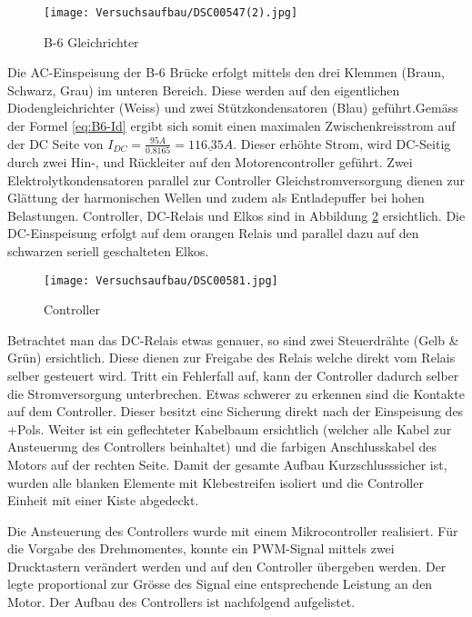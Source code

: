 \begin{figure}[H]
	\begin{center}
		\texttt{[image: Versuchsaufbau/DSC00547(2).jpg]}
		\caption[B-6 Gleichrichter]{B-6 Gleichrichter}
		\label{fig:B-6}
	\end{center}
\end{figure}

Die AC-Einspeisung der B-6 Brücke erfolgt mittels den drei Klemmen (Braun, Schwarz, Grau) im unteren Bereich. Diese werden auf den eigentlichen Diodengleichrichter (Weiss) und zwei Stützkondensatoren (Blau) geführt.Gemäss der Formel \ref{eq:B6-Id} ergibt sich somit einen maximalen Zwischenkreisstrom auf der DC Seite von $I_{DC}=\frac{95A}{0.8165} =\underline{116.35A}$.
Dieser erhöhte Strom, wird DC-Seitig durch zwei Hin-, und Rückleiter auf den Motorencontroller geführt. Zwei Elektrolytkondensatoren parallel zur Controller Gleichstromversorgung dienen zur Glättung der harmonischen Wellen und zudem als Entladepuffer bei hohen Belastungen. Controller, DC-Relais und Elkos sind in Abbildung \ref{fig:Controller} ersichtlich. Die DC-Einspeisung erfolgt auf dem orangen Relais und parallel dazu auf den schwarzen seriell geschalteten Elkos.

\begin{figure}[H]
	\begin{center}
		\texttt{[image: Versuchsaufbau/DSC00581.jpg]}
		\caption[Controller]{Controller}
		\label{fig:Controller}
	\end{center}
\end{figure}

Betrachtet man das DC-Relais etwas genauer, so sind zwei Steuerdrähte (Gelb \& Grün) ersichtlich. Diese dienen zur Freigabe des Relais welche direkt vom Relais selber gesteuert wird. Tritt ein Fehlerfall auf, kann der Controller dadurch selber die Stromversorgung unterbrechen. Etwas schwerer zu erkennen sind die Kontakte auf dem Controller. Dieser besitzt eine Sicherung direkt nach der Einspeisung des +Pols. Weiter ist ein geflechteter Kabelbaum ersichtlich (welcher alle Kabel zur Ansteuerung des Controllers beinhaltet) und die farbigen Anschlusskabel des Motors auf der rechten Seite. Damit der gesamte Aufbau Kurzschlusssicher ist, wurden alle blanken Elemente mit Klebestreifen isoliert und die Controller Einheit mit einer Kiste abgedeckt.

Die Ansteuerung des Controllers wurde mit einem Mikrocontroller realisiert. Für die Vorgabe des Drehmomentes, konnte ein PWM-Signal mittels zwei Drucktastern verändert werden und auf den Controller übergeben werden. Der legte proportional zur Grösse des Signal eine entsprechende Leistung an den Motor. Der Aufbau des Controllers ist nachfolgend aufgelistet.


